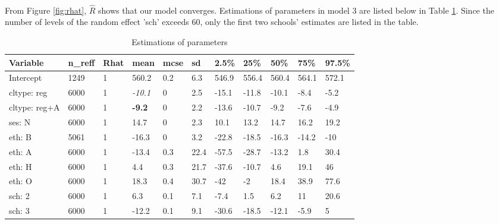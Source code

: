 \documentclass{article}
\begin{document}
\begin{minipage}{\linewidth}
    \label{fig:rhat}
\end{minipage}\\

From Figure \ref{fig:rhat}, $\hat{R}$ shows that our model converges. Estimations of parameters in model 3 are listed below in 
Table \ref{tab:estimation}. Since the number of levels of the random effect 'sch' exceeds 60, 
only the first two schools' estimates are listed in the table.

\begin{table}[h]
    \centering
    \caption{Estimations of parameters}
    \label{tab:estimation}
    \begin{tabular}{|l|l|l|l|l|l|l|l|l|l|l|}
    \hline
    Variable      & n\_reff & Rhat & mean           & mcse & sd   & 2.5\% & 25\%  & 50\%  & 75\%  & 97.5\% \\ \hline
    Intercept     & 1249    & 1    & 560.2          & 0.2  & 6.3  & 546.9 & 556.4 & 560.4 & 564.1 & 572.1  \\ \hline
    cltype: reg   & 6000    & 1    & \textit{-10.1} & 0    & 2.5  & -15.1 & -11.8 & -10.1 & -8.4  & -5.2   \\ \hline
    cltype: reg+A & 6000    & 1    & \textbf{-9.2}  & 0    & 2.2  & -13.6 & -10.7 & -9.2  & -7.6  & -4.9   \\ \hline
    ses: N        & 6000    & 1    & 14.7           & 0    & 2.3  & 10.1  & 13.2  & 14.7  & 16.2  & 19.2   \\ \hline
    eth: B        & 5061    & 1    & -16.3          & 0    & 3.2  & -22.8 & -18.5 & -16.3 & -14.2 & -10    \\ \hline
    eth: A        & 6000    & 1    & -13.4          & 0.3  & 22.4 & -57.5 & -28.7 & -13.2 & 1.8   & 30.4   \\ \hline
    eth: H        & 6000    & 1    & 4.4            & 0.3  & 21.7 & -37.6 & -10.7 & 4.6   & 19.1  & 46     \\ \hline
    eth: O        & 6000    & 1    & 18.3           & 0.4  & 30.7 & -42   & -2    & 18.4  & 38.9  & 77.6   \\ \hline
    sch: 2        & 6000    & 1    & 6.3            & 0.1  & 7.1  & -7.4  & 1.5   & 6.2   & 11    & 20.6   \\ \hline
    sch: 3        & 6000    & 1    & -12.2          & 0.1  & 9.1  & -30.6 & -18.5 & -12.1 & -5.9  & 5      \\ \hline
    \end{tabular}
\end{table}
\end{document}
